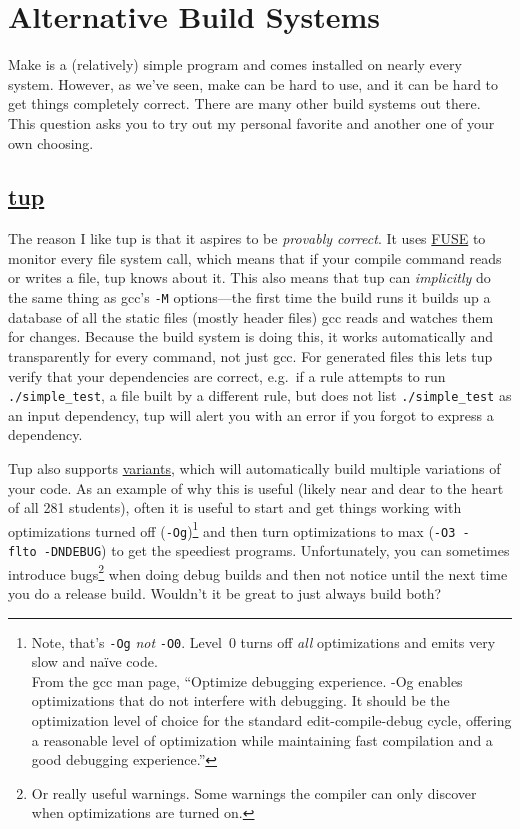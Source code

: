 \documentclass{article}
\begin{document}
\newpage
\section{Alternative Build Systems}

Make is a (relatively) simple program and comes installed on nearly every
system. However, as we've seen, make can be hard to use, and it can be hard to
get things completely correct. There are many other build systems out there.
This question asks you to try out my personal favorite and another one of your
own choosing.

\subsection{\href{http://gittup.org/tup/}{tup}}
The reason I like tup is that it aspires to be \emph{provably correct}. It
uses \href{https://en.wikipedia.org/wiki/Filesystem_in_Userspace}{FUSE} to
monitor every file system call, which means that if your compile command reads
or writes a file, tup knows about it. This also means that tup can
\emph{implicitly} do the same thing as gcc's \texttt{-M} options---the first
time the build runs it builds up a database of all the static files (mostly
header files) gcc reads and watches them for changes. Because the build system
is doing this, it works automatically and transparently for every command, not
just gcc.  For generated files this lets tup verify that your dependencies are
correct, e.g.\ if a rule attempts to run \texttt{./simple\_test}, a file built
by a different rule, but does not list \texttt{./simple\_test} as an input
dependency, tup will alert you with an error if you forgot to express a
dependency.

Tup also supports \href{http://gittup.org/tup/manual.html#lbAK}{variants},
which will automatically build multiple variations of your code.
%
As an example of why this is useful (likely near and dear to the heart of all
281 students), often it is useful to start and get things working with
optimizations turned off (\texttt{-Og})\footnote{
  Note, that's \texttt{-Og} \emph{not} \texttt{-O0}. Level~0 turns off
  \emph{all} optimizations and emits very slow and na\"ive code.
  \\
  From the gcc man page, ``Optimize debugging experience. -Og enables
  optimizations that do not interfere with debugging. It should be the
  optimization level of choice for the standard edit-compile-debug cycle,
  offering a reasonable level of optimization while maintaining fast
  compilation and a good debugging experience.''
} and then turn optimizations to max (\texttt{-O3~-flto~-DNDEBUG}) to get the
speediest programs. Unfortunately, you can sometimes introduce bugs\footnote{
  Or really useful warnings. Some warnings the compiler can only discover when
  optimizations are turned on.
} when doing debug builds and then not notice until the next time you do a
release build. Wouldn't it be great to just always build both?
\end{document}
